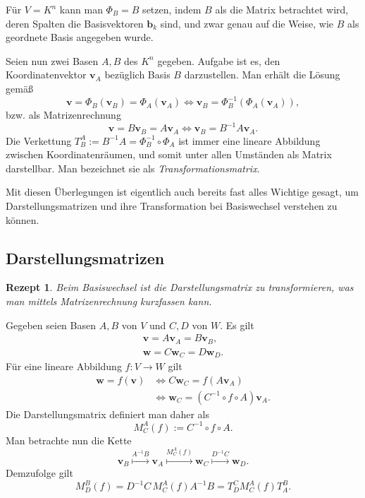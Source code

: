 \documentclass[a4paper,10pt,fleqn,twocolumn,twoside,dvipdfmx]{scrartcl}
\theoremstyle{rmbox}
\newtheorem{Rezept}{Rezept}[section]
\newcommand{\bv}[1]{\mathbf{#1}}
\begin{document}
Für $V=K^n$ kann man $\Phi_B=B$ setzen, indem $B$ als die Matrix
betrachtet wird, deren Spalten die Basisvektoren $\bv b_k$ sind,
und zwar genau auf die Weise, wie $B$ als geordnete Basis angegeben
wurde.

Seien nun zwei Basen $A,B$ des $K^n$ gegeben. Aufgabe ist es, den
Koordinatenvektor $\bv v_A$ bezüglich Basis $B$ darzustellen.
Man erhält die Lösung gemäß
\[\bv v = \Phi_B(\bv v_B) = \Phi_A(\bv v_A) \iff
\bv v_B = \Phi_B^{-1}(\Phi_A(\bv v_A)),\]
bzw. als Matrizenrechnung
\[\bv v = B\bv v_B = A\bv v_A\iff
\bv v_B = B^{-1}A\bv v_A.\]
Die Verkettung $T_B^A := B^{-1}A = \Phi_B^{-1}\circ\Phi_A$
ist immer eine lineare Abbildung zwischen
Koordinatenräumen, und somit unter allen Umständen als Matrix
darstellbar. Man bezeichnet sie als \emph{Transformationsmatrix}.

Mit diesen Überlegungen ist eigentlich auch bereits fast alles
Wichtige gesagt, um Darstellungsmatrizen und ihre Transformation
bei Basiswechsel verstehen zu können.

\newpage
\subsection{Darstellungsmatrizen}
\begin{Rezept}
Beim Basiswechsel ist die Darstellungsmatrix zu transformieren,
was man mittels Matrizenrechnung kurzfassen kann.
\end{Rezept}

\noindent
Gegeben seien Basen $A,B$ von $V$ und $C,D$ von $W$. Es gilt%
\begin{gather*}
\bv v = A\bv v_A = B\bv v_B,\\
\bv w = C\bv w_C = D\bv w_D.
\end{gather*}
Für eine lineare Abbildung $f\colon V\to W$ gilt%
\begin{align*}
\bv w = f(\bv v)&\iff C\bv w_C = f(A\bv v_A)\\
&\iff \bv w_C = (C^{-1}\circ f\circ A)\bv v_A.
\end{align*}
Die Darstellungsmatrix definiert man daher als%
\[M_C^A(f) := C^{-1}\circ f\circ A.\]
Man betrachte nun die Kette%
\[\bv v_B\stackrel{A^{-1}B}\longmapsto \bv v_A
\stackrel{M_C^A(f)}\longmapsto \bv w_C
\stackrel{D^{-1}C}\longmapsto \bv w_D.\]
Demzufolge gilt
\[M_D^B(f) = D^{-1}C\,M_C^A(f)A^{-1}B = T_D^C M_C^A(f) T_A^B.\]
\end{document}
